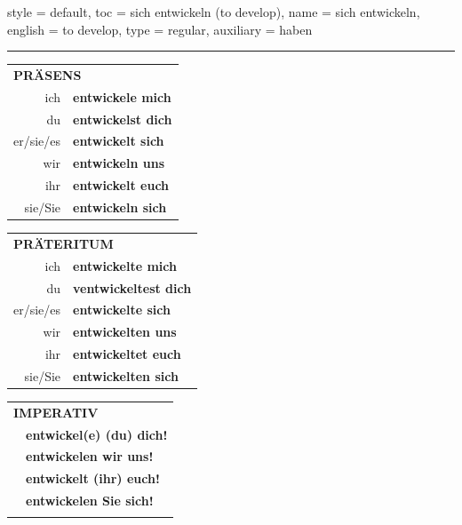 \begin{verbentry}{
  style = {default},
  toc = {sich entwickeln (to develop)},
  name = {sich entwickeln},
  english = {to develop},
  type = {regular},
  auxiliary = {haben}
}
 
    
       \vspace{5pt}

    \hrule
    
    \vspace{5pt}

  \begin{tabular}{rl}
     \multicolumn{2}{l}{\textbf{PRÄSENS} }\\
    ich & \textbf{entwickele mich}\\
    du & \textbf{entwickelst dich}\\
    er/sie/es & \textbf{entwickelt sich}\\
    wir & \textbf{entwickeln uns}\\
    ihr & \textbf{entwickelt euch}\\
    sie/Sie & \textbf{entwickeln sich}\\
  \end{tabular}
  \hfill
     \begin{tabular}{rl}
    \multicolumn{2}{l}{\textbf{PRÄTERITUM} }\\
    ich & \textbf{entwickelte mich}\\
    du & \textbf{ventwickeltest dich}\\
    er/sie/es & \textbf{entwickelte sich}\\
    wir & \textbf{entwickelten uns}\\
    ihr & \textbf{entwickeltet euch}\\
    sie/Sie & \textbf{entwickelten sich}\\
  \end{tabular}
  \hfill
  \begin{tabular}{rl}
     \multicolumn{2}{l}{\textbf{IMPERATIV} }\\
   & \textbf{entwickel(e) (du) dich!}\\
   & \textbf{entwickelen wir uns!}\\
   & \textbf{entwickelt (ihr) euch!}\\
   & \textbf{entwickelen Sie sich!}\\
   & \vspace{10pt}
  \end{tabular}

    \vspace{10pt}


\end{verbentry}
